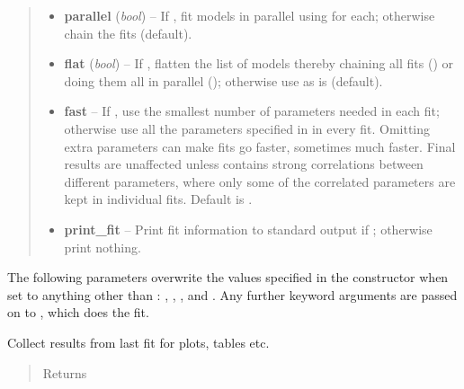 \documentclass[letterpaper,10pt,english]{sphinxmanual}
\begin{document}
\begin{fulllineitems}
\begin{fulllineitems}
\begin{quote}
\begin{description}
\begin{itemize}
\item {} 
\textbf{parallel} (\emph{bool}) -- If , fit models in parallel using 
for each; otherwise chain the fits (default).

\item {} 
\textbf{flat} (\emph{bool}) -- If , flatten the list of models thereby chaining
all fits () or doing them all in parallel
(); otherwise use  
as is (default).

\item {} 
\textbf{fast} -- If , use the smallest number of parameters needed
in each fit; otherwise use all the parameters specified in 
 in every fit. Omitting extra parameters can make 
fits go faster, sometimes much faster. Final results are 
unaffected unless  contains strong correlations between 
different parameters, where only some of the correlated parameters 
are kept in individual fits. Default is .

\item {} 
\textbf{print\_fit} -- Print fit information to standard output if 
; otherwise print nothing.

\end{itemize}

\end{description}\end{quote}

The following parameters overwrite the values specified in the
{\hyperref[corrfitter:corrfitter.CorrFitter]{}} constructor when set to anything other than :
, , , and . Any
further keyword arguments are passed on to
, which does the fit.

\end{fulllineitems}


\begin{fulllineitems}
\label{corrfitter:corrfitter.CorrFitter.collect_fitresults}
Collect results from last fit for plots, tables etc.
\begin{quote}\begin{description}
\item[{Returns}] \leavevmode


\end{description}
\end{quote}
\end{fulllineitems}
\end{fulllineitems}
\end{document}
